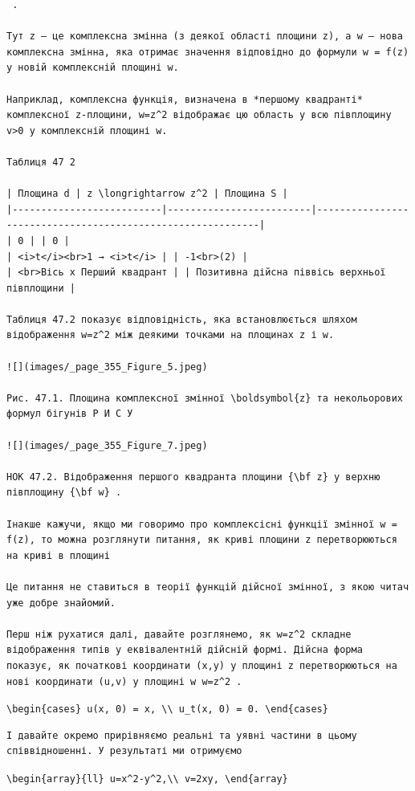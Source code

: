 \documentclass[
  ukrainian,
]{article}
\begin{document}
\begin{verbatim}
 .

Тут z — це комплексна змінна (з деякої області площини z), а w — нова комплексна змінна, яка отримає значення відповідно до формули w = f(z) у новій комплексній площині w.

Наприклад, комплексна функція, визначена в *першому квадранті* комплексної z-площини, w=z^2 відображає цю область у всю півплощину v>0 у комплексній площині w.

Таблиця 47 2

| Площина d | z \longrightarrow z^2 | Площина S |
|--------------------------|-------------------------|------------------------------------------------------------|
| 0 | | 0 |
| <i>t</i><br>1 → <i>t</i> | | -1<br>(2) |
| <br>Вісь x Перший квадрант | | Позитивна дійсна піввісь верхньої півплощини |

Таблиця 47.2 показує відповідність, яка встановлюється шляхом відображення w=z^2 між деякими точками на площинах z і w.

![](images/_page_355_Figure_5.jpeg)

Рис. 47.1. Площина комплексної змінної \boldsymbol{z} та некольорових формул бігунів Р И С У

![](images/_page_355_Figure_7.jpeg)

НОК 47.2. Відображення першого квадранта площини {\bf z} у верхню півплощину {\bf w} .

Інакше кажучи, якщо ми говоримо про комплексісні функції змінної w = f(z), то можна розглянути питання, як криві площини z перетворюються на криві в площині

Це питання не ставиться в теорії функцій дійсної змінної, з якою читач уже добре знайомий.

Перш ніж рухатися далі, давайте розглянемо, як w=z^2 складне відображення типів у еквівалентній дійсній формі. Дійсна форма показує, як початкові координати (x,y) у площині z перетворюються на нові координати (u,v) у площині w w=z^2 .
\end{verbatim}

\texttt{\textbackslash{}begin\{cases\}\ u(x,\ 0)\ =\ x,\ \textbackslash{}\textbackslash{}\ u\_t(x,\ 0)\ =\ 0.\ \textbackslash{}end\{cases\}}

\begin{verbatim}
І давайте окремо прирівняємо реальні та уявні частини в цьому співвідношенні. У результаті ми отримуємо
\end{verbatim}

\texttt{\textbackslash{}begin\{array\}\{ll\}\ u=x\^{}2-y\^{}2,\textbackslash{}\textbackslash{}\ v=2xy,\ \textbackslash{}end\{array\}}
\end{document}
